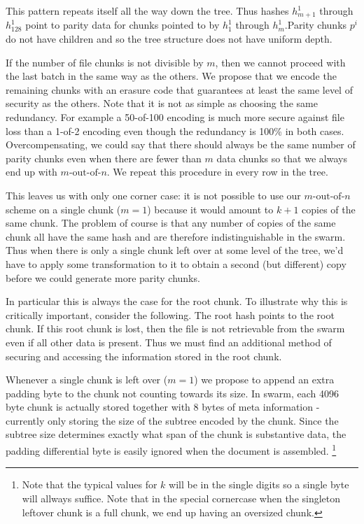 \documentclass[12pt]{article}
\begin{document}
This pattern repeats itself all the way down the tree. Thus hashes $h^1_{m+1}$ through $h^1_{128}$ point to parity data for chunks pointed to by $h^1_1$ through $h^1_{m}$.Parity chunks $p^i$ do not have children and so the tree structure does not have uniform depth.

If the number of file chunks is not divisible by $m$, then we cannot proceed with the last batch in the same way as the others. We propose that we encode the remaining chunks with an erasure code that guarantees at least the same level of security as the others. Note that it is not as simple as choosing the same redundancy. For example a 50-of-100 encoding is much more secure against file loss than a 1-of-2 encoding even though the redundancy is 100\% in both cases. Overcompensating, we could say that there should always be the same number of parity chunks even when there are fewer than $m$ data chunks so that we always end up with $m\text{-out-of-}n$. We repeat this procedure in every row in the tree.

This leaves us with only one corner case: it is not possible to use our $m\text{-out-of-}n$ scheme on a single chunk ($m=1$) because it would amount to $k+1$ copies of the same chunk. The problem of course is that any number of copies of the same chunk all have the same hash and are therefore indistinguishable in the swarm. Thus when there is only a single chunk left over at some level of the tree, we'd have to apply some transformation to it to obtain a second (but different) copy before we could generate more parity chunks.

In particular this is always the case for the root chunk. To illustrate why this is critically important, consider the following. The root hash points to the root chunk. If this root chunk is lost, then the file is not retrievable from the swarm even if all other data is present. Thus we must find an additional method of securing and accessing the information stored in the root chunk.

Whenever a single chunk is left over ($m=1$) we propose to append an extra padding byte to the chunk not counting towards its size. In swarm, each 4096 byte chunk is actually stored together with 8 bytes of meta information - currently only storing the size of the subtree encoded by the chunk. Since the subtree size determines exactly what span of the chunk is substantive data, the padding differential byte is easily ignored when the document is assembled.%
%
\footnote{%
Note that the typical values for $k$ will be in the single digits so a single byte will allways suffice. Note that in the special cornercase when the singleton leftover chunk is a full chunk, we end up having an oversized chunk.
}
\end{document}

